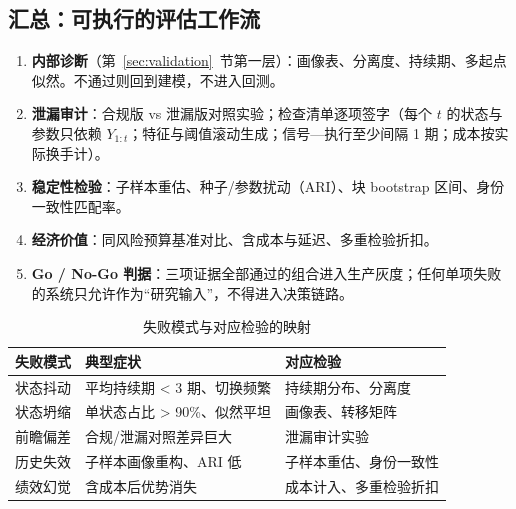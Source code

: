 \subsection{汇总：可执行的评估工作流}

\begin{enumerate}[itemsep=3pt]
\item \textbf{内部诊断}（第~\ref{sec:validation}~节第一层）：画像表、分离度、持续期、多起点似然。不通过则回到建模，不进入回测。
\item \textbf{泄漏审计}：合规版 vs 泄漏版对照实验；检查清单逐项签字（每个 $t$ 的状态与参数只依赖 $Y_{1:t}$；特征与阈值滚动生成；信号—执行至少间隔 1 期；成本按实际换手计）。
\item \textbf{稳定性检验}：子样本重估、种子/参数扰动（ARI）、块 bootstrap 区间、身份一致性匹配率。
\item \textbf{经济价值}：同风险预算基准对比、含成本与延迟、多重检验折扣。
\item \textbf{Go / No-Go 判据}：三项证据全部通过的组合进入生产灰度；任何单项失败的系统只允许作为“研究输入”，不得进入决策链路。
\end{enumerate}

\begin{table}[htbp]
\centering
\footnotesize
\begin{tabular}{p{3.6cm}p{5.4cm}p{3.6cm}}
\toprule
\textbf{失败模式} & \textbf{典型症状} & \textbf{对应检验} \\
\midrule
状态抖动 & 平均持续期 < 3 期、切换频繁 & 持续期分布、分离度 \\
状态坍缩 & 单状态占比 > 90\%、似然平坦 & 画像表、转移矩阵 \\
前瞻偏差 & 合规/泄漏对照差异巨大 & 泄漏审计实验 \\
历史失效 & 子样本画像重构、ARI 低 & 子样本重估、身份一致性 \\
绩效幻觉 & 含成本后优势消失 & 成本计入、多重检验折扣 \\
\bottomrule
\end{tabular}
\caption{失败模式与对应检验的映射}
\label{tab:failure-modes}
\end{table}

